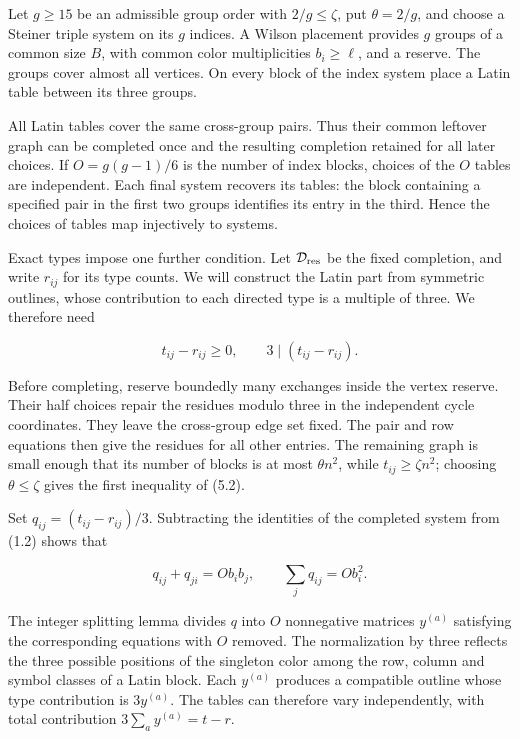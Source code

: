\documentclass[english,11pt,a4paper]{article}
\begin{document}
Let \(g\ge15\) be an admissible group order with \(2/g\le\zeta\), put \(\theta=2/g\), and choose a Steiner triple system on its \(g\) indices. A Wilson placement provides \(g\) groups of a common size \(B\), with common color multiplicities \(b_i\ge\ell\), and a reserve. The groups cover almost all vertices. On every block of the index system place a Latin table between its three groups.

All Latin tables cover the same cross-group pairs. Thus their common leftover graph can be completed once and the resulting completion retained for all later choices. If \(O=g(g-1)/6\) is the number of index blocks, choices of the \(O\) tables are independent. Each final system recovers its tables: the block containing a specified pair in the first two groups identifies its entry in the third. Hence the choices of tables map injectively to systems.

Exact types impose one further condition. Let \(\mathcal D_{\rm res}\) be the fixed completion, and write \(r_{ij}\) for its type counts. We will construct the Latin part from symmetric outlines, whose contribution to each directed type is a multiple of three. We therefore need

\[t_{ij}-r_{ij}\ge0,\qquad 3\mid(t_{ij}-r_{ij}).\tag{5.2}\]

Before completing, reserve boundedly many exchanges inside the vertex reserve. Their half choices repair the residues modulo three in the independent cycle coordinates. They leave the cross-group edge set fixed. The pair and row equations then give the residues for all other entries. The remaining graph is small enough that its number of blocks is at most \(\theta n^2\), while \(t_{ij}\ge\zeta n^2\); choosing \(\theta\le\zeta\) gives the first inequality of (5.2).

Set \(q_{ij}=(t_{ij}-r_{ij})/3\). Subtracting the identities of the completed system from (1.2) shows that

\[q_{ij}+q_{ji}=O b_ib_j,\qquad \sum_jq_{ij}=O b_i^2.\]

The integer splitting lemma divides \(q\) into \(O\) nonnegative matrices \(y^{(a)}\) satisfying the corresponding equations with \(O\) removed. The normalization by three reflects the three possible positions of the singleton color among the row, column and symbol classes of a Latin block. Each \(y^{(a)}\) produces a compatible outline whose type contribution is \(3y^{(a)}\). The tables can therefore vary independently, with total contribution \(3\sum_a y^{(a)}=t-r\).
\end{document}
